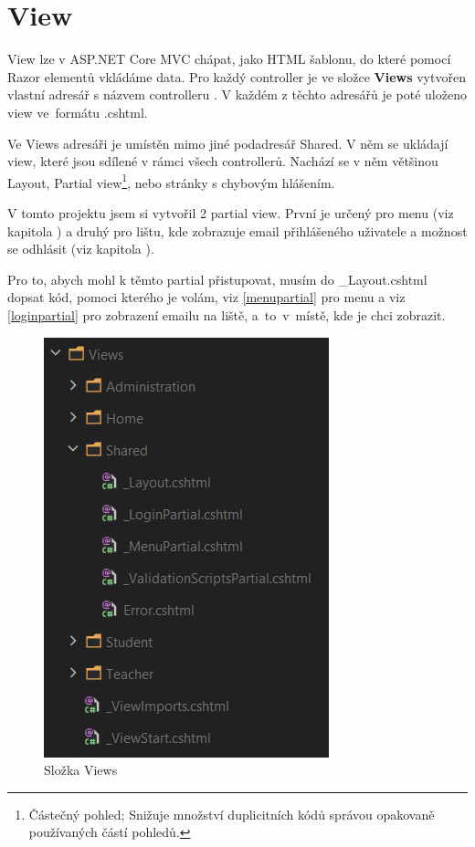 \documentclass[a4paper, 12pt]{report}
\begin{document}
	\section{View}
	View lze v ASP.NET Core MVC chápat, jako HTML šablonu, do které pomocí Razor elementů vkládáme data. Pro každý controller je ve složce \textbf{Views} vytvořen vlastní adresář s názvem controlleru . V každém z těchto adresářů je poté uloženo view ve~formátu .cshtml.\par
	Ve Views adresáři je umístěn mimo jiné podadresář Shared. V něm se ukládají view, které jsou sdílené v rámci všech controllerů. Nachází se v něm většinou Layout, Partial view\footnote{Částečný pohled; Snižuje množství duplicitních kódů správou opakovaně používaných částí pohledů.}, nebo stránky s chybovým hlášením.\par
	V tomto projektu jsem si vytvořil 2 partial view. První je určený pro menu (viz kapitola ) a druhý pro lištu, kde zobrazuje email přihlášeného uživatele a možnost se odhlásit (viz kapitola ).\par
	Pro to, abych mohl k těmto partial přistupovat, musím do \_Layout.cshtml dopsat kód, pomoci kterého je volám, viz \ref{menupartial} pro menu a viz \ref{loginpartial} pro zobrazení emailu na liště, a~to~v~místě, kde je chci zobrazit.
	\begin{figure}[H]
		\centering
		\includegraphics[scale=0.7]{ViewsDetail}
		\caption{Složka Views}
		\label{ViewsDetail}
	\end{figure}
\end{document}
